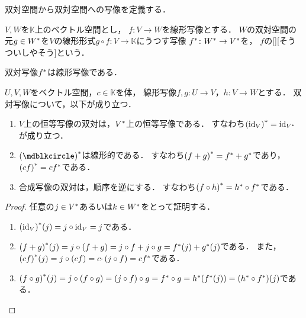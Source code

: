 \documentclass[../sotsu.tex]{subfiles}
\begin{document}
双対空間から双対空間への写像を定義する．

\begin{definition}
    \label{dfn:dual-map}
    $V, W$を$𝕂$上のベクトル空間とし，
    $f \colon V \to W$を線形写像とする．
    $W$の双対空間の元$g \in {W}^*$を$V$の線形形式$g \circ f \colon V \to 𝕂$にうつす写像
    ${f}^* \colon {W}^* \to {V}^*$を，
    $f$の[][そうついしやそう]という\cite[\S 4.3]{saito-lin-2007}．
\end{definition}

双対写像${f}^*$は線形写像である\cite[\S 4.3]{saito-lin-2007}．

\begin{proposition}
    \label{thm:dual-map-property}
    $U, V, W$をベクトル空間，$c \in 𝕂$を体，
    線形写像$f, g \colon U \to V$，$h \colon V \to W$とする．
    双対写像について，以下が成り立つ\cite[\S 4.3]{saito-lin-2007}．
    \begin{enumerate}
        \item $V$上の恒等写像の双対は，${V}^*$上の恒等写像である．
            すなわち${(\mathrm{id}_V)}^* = \mathrm{id}_{{V}^*}$が成り立つ．
        \item $\dual{(\bigdot)}$は線形的である．
            すなわち${(f + g)}^* = {f}^* + {g}^*$であり，${(cf)}^* = c{f}^*$である．
        \item 合成写像の双対は，順序を逆にする．
            すなわち${(f \circ h)}^* = {h}^* \circ {f}^*$である．
    \end{enumerate}
\end{proposition}

\begin{proof}
    任意の$j \in {V}^*$あるいは$k \in {W}^*$をとって証明する．
    \begin{enumerate}
        \item ${(\mathrm{id}_V)}^*(j) = j \circ \mathrm{id}_V = j$である．
        \item ${(f + g)}^*(j) = j \circ (f + g) = j \circ f + j \circ g = {f}^*(j) + {g}^*(j)$である．
            また，${(cf)}^*(j) = j \circ (cf) = c \cdotp (j \circ f) = c{f}^*$である．
        \item \(
            {(f \circ g)}^*(j) = j \circ (f \circ g) = (j \circ f) \circ g = {f}^* \circ g 
                = {h}^*( {f}^*(j) ) = ({h}^* \circ {f}^*)(j)
            \)である．
    \end{enumerate}
\end{proof}
\end{document}
